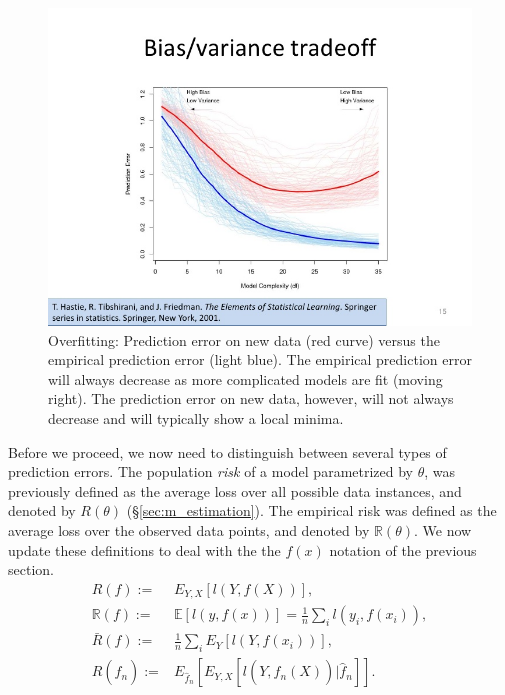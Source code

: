 \documentclass[12pt,a4paper]{article}
\theoremstyle{plain}
\theoremstyle{definition}
\newcommand{\expectg}[2]{E_{#1}\left[ #2 \right]}
\newcommand{\expectn}[1]{\mathbb{E}[#1]}
\newcommand{\loss}{l}
\newcommand{\risk}{R}
\newcommand{\riskn}{\mathbb{R}}
\newcommand{\hyp}{f}
\newcommand{\test}{\risk(\hyp)}
\newcommand{\train}{\riskn(\hyp)}
\newcommand{\insample}{\bar{\risk}(\hyp)}
\newcommand{\EPE}{\risk(\hat{\hyp}_n)}
\begin{document}
\begin{figure}[h]
        \centering
        \includegraphics[width=1\textwidth]{art/support-vector-machine-15-728}
        \caption{Overfitting: 
        Prediction error on new data (red curve) versus the empirical prediction error (light blue).
        The empirical prediction error will always decrease as more complicated models are fit (moving right).
        The prediction error on new data, however, will not always decrease and will typically show a local minima.
        \label{fig:bias_variance}}
\end{figure}

Before we proceed, we now need to distinguish between several types of prediction errors.
The population \emph{risk} of a model parametrized by $\theta$, was previously defined as the average loss over all possible data instances, and denoted by $\risk(\theta)$ (\S \ref{sec:m_estimation}).
The empirical risk was defined as the average loss over the observed data points, and denoted by $\riskn(\theta)$.
We now update these definitions to deal with the the $\hyp(x)$ notation of the previous section.
\begin{align}
	\test :=& \expectg{Y,X}{\loss(Y,\hyp(X))}, \label{eq:test_error} \\
	\train :=& \expectn{\loss(y,\hyp(x))} = \frac{1}{n} \sum_i \loss(y_i,\hyp(x_i)),  \label{eq:training_error} \\
	\insample :=& \frac{1}{n} \sum_i \expectg{Y}{\loss(Y,\hyp(x_i))}, \label{eq:in_sample} \\
	\EPE :=& \expectg{\hat{\hyp}_n}{
		\expectg{Y,X}{\loss(Y,\hat{\hyp}_n(X))|\hat{\hyp}_n}
	}.\label{eq:epe}
\end{align}
\end{document}
